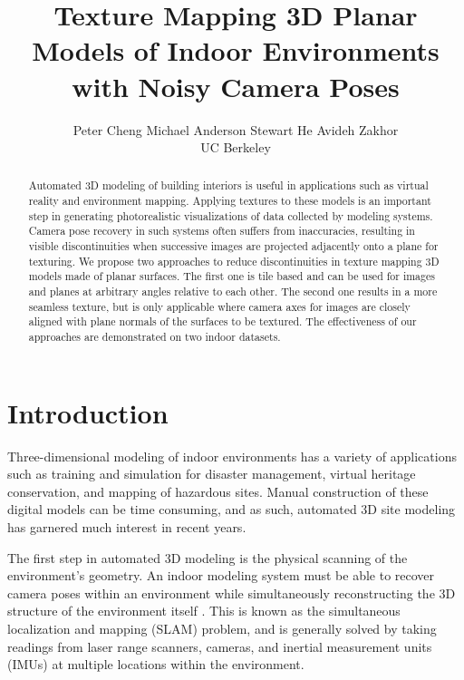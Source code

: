 \message{ !name(oldpaper.tex)}\documentclass[10pt,twocolumn,letterpaper]{article}
\begin{document}


\title{Texture Mapping 3D Planar Models of Indoor Environments with Noisy
  Camera Poses}

\author{Peter Cheng \hspace*{2em} Michael Anderson \hspace*{2em} Stewart He \hspace*{2em} Avideh Zakhor\\
  UC Berkeley\\
}
\maketitle

\begin{abstract}
  Automated 3D modeling of building interiors is useful in
  applications such as virtual reality and environment
  mapping. Applying textures to these models is an important step in
  generating photorealistic visualizations of data collected by
  modeling systems. Camera pose recovery in such systems often suffers
  from inaccuracies, resulting in visible discontinuities when
  successive images are projected adjacently onto a plane for
  texturing. We propose two approaches to reduce discontinuities in
  texture mapping 3D models made of planar surfaces. The first one is
  tile based and can be used for images and planes at arbitrary angles
  relative to each other. The second one results in a more seamless
  texture, but is only applicable where camera axes for images are
  closely aligned with plane normals of the surfaces to be
  textured. The effectiveness of our approaches are demonstrated on
  two indoor datasets.
\end{abstract}

\section{Introduction}
\label{sec:introduction}
Three-dimensional modeling of indoor environments has a variety of
applications such as training and simulation for disaster management,
virtual heritage conservation, and mapping of hazardous sites. Manual
construction of these digital models can be time consuming, and as
such, automated 3D site modeling has garnered much interest in recent
years.

The first step in automated 3D modeling is the physical scanning of
the environment's geometry. An indoor modeling system must be able to
recover camera poses within an environment while simultaneously
reconstructing the 3D structure of the environment itself
\cite{chen2010indoor, hz, kua2012loopclosure, liu2010indoor}. This is
known as the simultaneous localization and mapping (SLAM) problem, and
is generally solved by taking readings from laser range scanners,
cameras, and inertial measurement units (IMUs) at multiple locations
within the environment.
\end{document}
